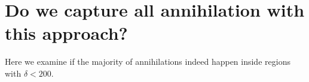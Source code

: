 \appendix

\section{Do we capture all annihilation with this approach?}

Here we examine if the majority of annihilations indeed happen inside regions with $\delta \lt 200$.